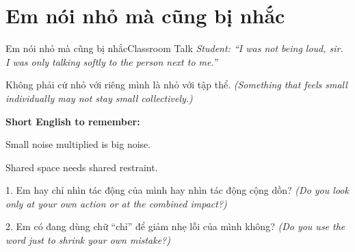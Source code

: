 \section{Em nói nhỏ mà cũng bị nhắc}
\begin{truyen}{Em nói nhỏ mà cũng bị nhắc}{Classroom Talk}
\textit{Student: ``I was not being loud, sir. I was only talking softly to the person next to me.''}\\[4pt]



\end{truyen}

\begin{baihoc}
Không phải cứ nhỏ với riêng mình là nhỏ với tập thể.
\textit{(Something that feels small individually may not stay small collectively.)}
\end{baihoc}

\begin{ghinhoanh}
\textbf{Short English to remember:}

Small noise multiplied is big noise.

Shared space needs shared restraint.
\end{ghinhoanh}

\begin{tuhocnhanh}
1. Em hay chỉ nhìn tác động của mình hay nhìn tác động cộng dồn? \textit{(Do you look only at your own action or at the combined impact?)}

2. Em có đang dùng chữ ``chỉ'' để giảm nhẹ lỗi của mình không? \textit{(Do you use the word just to shrink your own mistake?)}
\end{tuhocnhanh}
\ngancach

